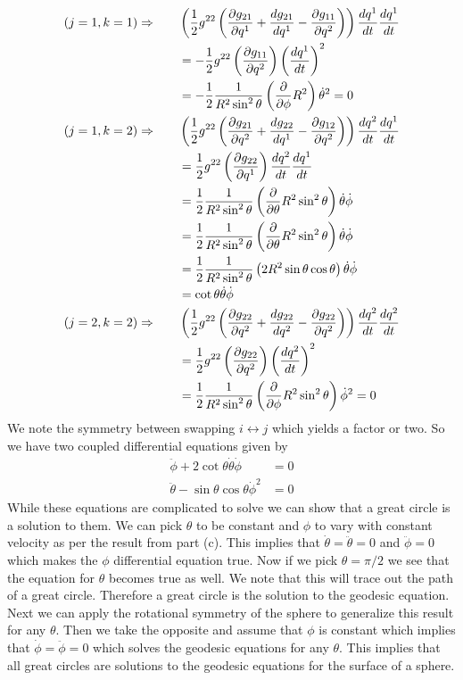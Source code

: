 \documentclass[11pt]{article}
\numberwithin{equation}{section}
\begin{document}
\begin{enumerate}[(a)]
\begin{align*}
(j=1,k=1)\Rightarrow\qquad &\left(\frac{1}{2}g^{22}\left(\frac{\partial g_{21}}{\partial q^1} + \frac{dg_{21}}{dq^{1}} - \frac{\partial{g_{11}}}{\partial{q^2}}\right)\right)\frac{dq^{1}}{dt}\frac{dq^1}{dt}\\
&= -\frac{1}{2}g^{22}\left(\frac{\partial{g_{11}}}{\partial{q^2}}\right)\left(\frac{dq^{1}}{dt}\right)^2\\
&= -\frac{1}{2}\frac{1}{R^2\sin^2\theta}\left(\frac{\partial{}}{\partial{\phi}}R^2\right)\dot\theta^2 = 0\\
(j=1,k=2)\Rightarrow\qquad &\left(\frac{1}{2}g^{22}\left(\frac{\partial g_{21}}{\partial q^2} + \frac{dg_{22}}{dq^{1}} - \frac{\partial{g_{12}}}{\partial{q^2}}\right)\right)\frac{dq^{2}}{dt}\frac{dq^1}{dt}\\
&= \frac{1}{2}g^{22}\left(\frac{\partial g_{22}}{\partial q^{1}}\right)\frac{dq^{2}}{dt}\frac{dq^1}{dt}\\
&= \frac{1}{2}\frac{1}{R^2\sin^2\theta}\left(\frac{\partial{}}{\partial{\theta}}R^2\sin^2\theta\right)\dot\theta\dot\phi\\
&= \frac{1}{2}\frac{1}{R^2\sin^2\theta}\left(\frac{\partial{}}{\partial{\theta}}R^2\sin^2\theta\right)\dot\theta\dot\phi\\
&= \frac{1}{2}\frac{1}{R^2\sin^2\theta}\left(2R^2\sin\theta\cos\theta\right)\dot\theta\dot\phi\\
&= \cot\theta\dot\theta\dot\phi\\
(j=2,k=2)\Rightarrow\qquad &\left(\frac{1}{2}g^{22}\left(\frac{\partial g_{22}}{\partial q^2} + \frac{dg_{22}}{dq^{2}} - \frac{\partial{g_{22}}}{\partial{q^2}}\right)\right)\frac{dq^{2}}{dt}\frac{dq^2}{dt}\\
&= \frac{1}{2}g^{22}\left(\frac{\partial g_{22}}{\partial q^2}\right)\left(\frac{dq^{2}}{dt}\right)^2\\
&= \frac{1}{2}\frac{1}{R^2\sin^2\theta}\left(\frac{\partial}{\partial\phi}R^2\sin^2\theta\right)\dot\phi^2 = 0
\end{align*}
We note the symmetry between swapping $i\leftrightarrow{j}$ which yields a factor or two. So 
we have two coupled differential equations given by
\begin{align*}
\ddot\phi + 2\cot\theta\dot\theta\dot\phi &= 0\\
\ddot{\theta} - \sin\theta\cos\theta\dot\phi^2 &= 0
\end{align*}
While these equations are complicated to solve we can show that a great circle is a solution
to them. We can pick $\theta$ to be constant and $\phi$ to vary with constant velocity as per
the result from part (c). 
This implies that $\dot\theta=\ddot\theta=0$ and $\ddot\phi=0$ which
makes the $\phi$ differential equation true. Now if we pick $\theta=\pi/2$ we see that the 
equation for $\theta$ becomes true as well. We note that this will trace out the path of a 
great circle. Therefore a great circle is the solution to the geodesic equation. Next we can
apply the rotational symmetry of the sphere to generalize this result for any $\theta$. Then
we take the opposite and assume that $\phi$ is constant which implies that $\dot\phi=\ddot\phi
=0$ which solves the geodesic equations for any $\theta$. This implies that all great circles
are solutions to the geodesic equations for the surface of a sphere. 
\end{enumerate}
\end{document}
